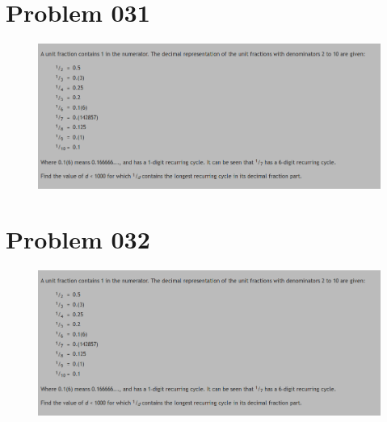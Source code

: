 \section{Problem 031}
\begin{prob}
	\begin{figure}[htb!]
		\begin{center}
			\includegraphics[scale = 0.4]{pic/026.png}
		\end{center}
	\end{figure}
\end{prob}

\section{Problem 032}
\begin{prob}
	\begin{figure}[htb!]
		\begin{center}
			\includegraphics[scale = 0.4]{pic/026.png}
		\end{center}
	\end{figure}
\end{prob}

